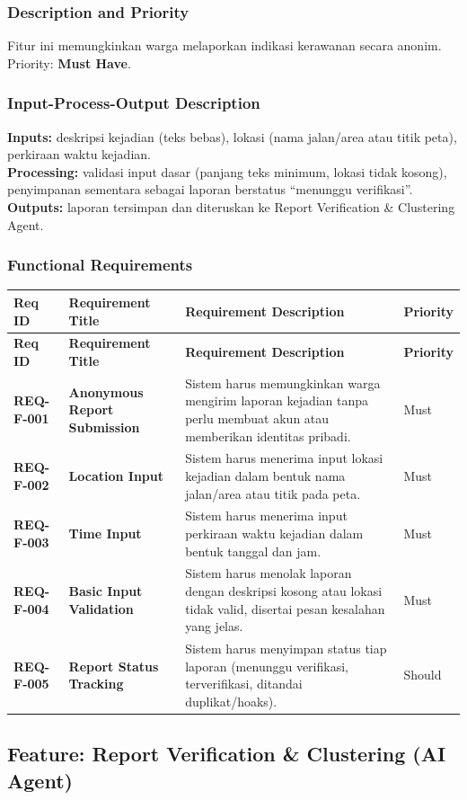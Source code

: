 \documentclass[11pt,a4paper]{article}
\newcommand{\req}[4]{\textbf{#1} & \textbf{#2} & #3 & #4 \\ \hline}
\begin{document}
\subsubsection{Description and Priority}
Fitur ini memungkinkan warga melaporkan indikasi kerawanan secara anonim. Priority: \textbf{Must Have}.

\subsubsection{Input-Process-Output Description}
\textbf{Inputs:} deskripsi kejadian (teks bebas), lokasi (nama jalan/area atau titik peta), perkiraan waktu kejadian.\\
\textbf{Processing:} validasi input dasar (panjang teks minimum, lokasi tidak kosong), penyimpanan sementara sebagai laporan berstatus ``menunggu verifikasi''.\\
\textbf{Outputs:} laporan tersimpan dan diteruskan ke Report Verification \& Clustering Agent.

\subsubsection{Functional Requirements}
\begin{longtable}{|L{2.3cm}|L{4.0cm}|L{6.9cm}|L{1.6cm}|}
\hline
{}\textbf{Req ID} & \textbf{Requirement Title} & \textbf{Requirement Description} & \textbf{Priority} \\ \hline
\endfirsthead
\hline
{}\textbf{Req ID} & \textbf{Requirement Title} & \textbf{Requirement Description} & \textbf{Priority} \\ \hline
\endhead
\req{REQ-F-001}{Anonymous Report Submission}{Sistem harus memungkinkan warga mengirim laporan kejadian tanpa perlu membuat akun atau memberikan identitas pribadi.}{Must}
\req{REQ-F-002}{Location Input}{Sistem harus menerima input lokasi kejadian dalam bentuk nama jalan/area atau titik pada peta.}{Must}
\req{REQ-F-003}{Time Input}{Sistem harus menerima input perkiraan waktu kejadian dalam bentuk tanggal dan jam.}{Must}
\req{REQ-F-004}{Basic Input Validation}{Sistem harus menolak laporan dengan deskripsi kosong atau lokasi tidak valid, disertai pesan kesalahan yang jelas.}{Must}
\req{REQ-F-005}{Report Status Tracking}{Sistem harus menyimpan status tiap laporan (menunggu verifikasi, terverifikasi, ditandai duplikat/hoaks).}{Should}
\end{longtable}

\subsection{Feature: Report Verification \& Clustering (AI Agent)}
\end{document}

